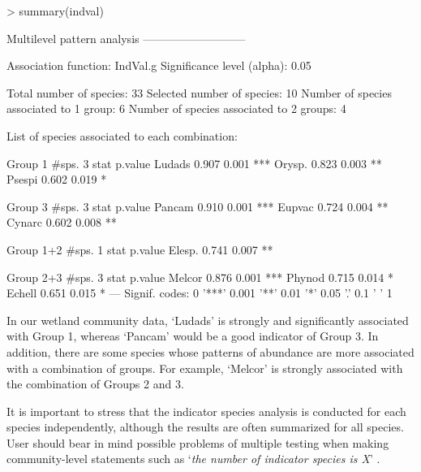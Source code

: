 \documentclass[11pt,a4paper]{article}
\begin{document}
\begin{Schunk}
\begin{Sinput}
> summary(indval) 
\end{Sinput}
\begin{Soutput}
 Multilevel pattern analysis
 ---------------------------

 Association function: IndVal.g
 Significance level (alpha): 0.05

 Total number of species: 33
 Selected number of species: 10 
 Number of species associated to 1 group: 6 
 Number of species associated to 2 groups: 4 

 List of species associated to each combination: 

 Group 1  #sps.  3 
        stat p.value    
Ludads 0.907   0.001 ***
Orysp. 0.823   0.003 ** 
Psespi 0.602   0.019 *  

 Group 3  #sps.  3 
        stat p.value    
Pancam 0.910   0.001 ***
Eupvac 0.724   0.004 ** 
Cynarc 0.602   0.008 ** 

 Group 1+2  #sps.  1 
        stat p.value   
Elesp. 0.741   0.007 **

 Group 2+3  #sps.  3 
        stat p.value    
Melcor 0.876   0.001 ***
Phynod 0.715   0.014 *  
Echell 0.651   0.015 *  
---
Signif. codes:  0 '***' 0.001 '**' 0.01 '*' 0.05 '.' 0.1 ' ' 1 
\end{Soutput}
\end{Schunk}
In our wetland community data, `Ludads' is strongly and significantly associated with Group 1, whereas `Pancam' would be a good indicator of Group 3. In addition, there are some species whose patterns of abundance are more associated with a combination of groups. For example, `Melcor' is strongly associated with the combination of Groups 2 and 3.

It is important to stress that the indicator species analysis is conducted for each species independently, although the results are often summarized for all species. User should bear in mind possible problems of multiple testing when making community-level statements such as `\emph{the number of indicator species is X}' \citep{DeCaceres2009}\citep{Legendre2012}.
\end{document}
